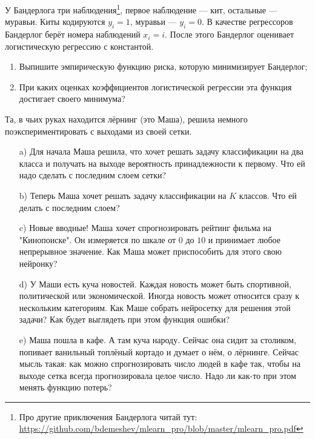 \documentclass[12pt, a4paper, oneside]{article}
\theoremstyle{plain} %
\theoremstyle{definition}
\begin{document}

\begin{problem}
	У Бандерлога три наблюдения\footnote{Про другие приключения Бандерлога читай тут: \url{https://github.com/bdemeshev/mlearn_pro/blob/master/mlearn_pro.pdf}}, первое наблюдение — кит, остальные — муравьи. Киты кодируются $y_i = 1$, муравьи — $y_i = 0$.  В качестве регрессоров Бандерлог берёт номера наблюдений $x_i = i$.  После этого Бандерлог оценивает логистическую регрессию с константой.
	
	\begin{enumerate}
		\item Выпишите эмпирическую функцию риска, которую минимизирует Бандерлог;
		\item При каких оценках коэффициентов логистической регрессии эта функция достигает своего минимума?
	\end{enumerate}
\end{problem}



\begin{problem}{ }
Та, в чьих руках находится лёрнинг (это Маша), решила немного поэкспериментировать с выходами из своей сетки. 
\begin{itemize}
	\item[a)]  Для начала Маша решила, что хочет решать задачу классификации на два класса и получать на выходе вероятность принадлежности к первому. Что ей надо сделать с последним слоем сетки? 
	\item[b)]  Теперь Маша хочет решать задачу классификации на $K$ классов. Что ей делать с последним слоем? 
	\item[c)]  Новые вводные! Маша хочет спрогнозировать рейтинг фильма на "Кинопоиске". Он измеряется по шкале от $0$ до $10$ и принимает любое непрерывное значение. Как Маша может приспособить для этого свою нейронку? 
	\item[d)]  У Маши есть куча новостей. Каждая новость может быть спортивной, политической или экономической. Иногда новость может относится сразу к нескольким категориям. Как Маше собрать нейросетку для решения этой задачи?  Как будет выглядеть при этом функция ошибки? 
	\item[e)]  Маша пошла в кафе. А там куча народу. Сейчас она сидит за столиком, попивает ванильный топлёный кортадо и думает о нём, о лёрнинге.  Сейчас мысль такая: как можно спрогнозировать число людей в кафе так, чтобы на выходе сетка всегда прогнозировала целое число. Надо ли как-то при этом менять функцию потерь? 
\end{itemize}
\end{problem}
\end{document}
